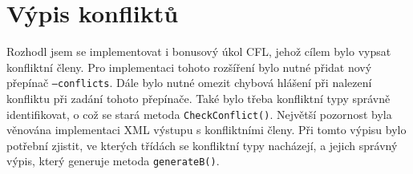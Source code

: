 \documentclass[10pt,a4paper,final]{article}
\begin{document}
   

  \section{Výpis konfliktů} \label{konfliktne-cleny}

Rozhodl jsem se implementovat i bonusový úkol CFL, jehož cílem bylo vypsat konfliktní členy. Pro implementaci tohoto rozšíření bylo nutné přidat nový přepínač \texttt{--conflicts}. Dále bylo nutné omezit chybová hlášení při nalezení konfliktu při zadání tohoto přepínače. Také bylo třeba konfliktní typy správně identifikovat, o což se stará metoda \texttt{CheckConflict()}. Největší pozornost byla věnována implementaci XML výstupu s konfliktními členy. Při tomto výpisu bylo potřební zjistit, ve kterých třídách se konfliktní typy nacházejí, a jejich správný výpis, který generuje metoda \texttt{generateB()}.

    
\end{document}
